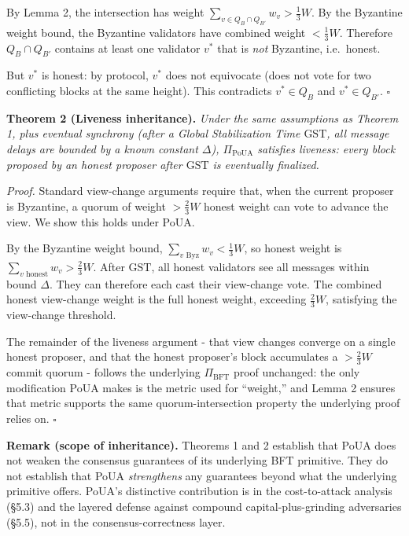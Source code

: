 \documentclass[
  11pt,
]{article}
\begin{document}
By Lemma 2, the intersection has weight
\(\sum_{v \in Q_B \cap Q_{B'}} w_v > \frac{1}{3} W\). By the Byzantine
weight bound, the Byzantine validators have combined weight
\(< \frac{1}{3} W\). Therefore \(Q_B \cap Q_{B'}\) contains at least one
validator \(v^*\) that is \emph{not} Byzantine, i.e.~honest.

But \(v^*\) is honest: by protocol, \(v^*\) does not equivocate (does
not vote for two conflicting blocks at the same height). This
contradicts \(v^* \in Q_B\) and \(v^* \in Q_{B'}\). \(\square\)

\textbf{Theorem 2 (Liveness inheritance).} \emph{Under the same
assumptions as Theorem 1, plus eventual synchrony (after a Global
Stabilization Time \(\text{GST}\), all message delays are bounded by a
known constant \(\Delta\)), \(\Pi_{\text{PoUA}}\) satisfies liveness:
every block proposed by an honest proposer after \(\text{GST}\) is
eventually finalized.}

\emph{Proof.} Standard view-change arguments require that, when the
current proposer is Byzantine, a quorum of weight \(> \frac{2}{3} W\)
honest weight can vote to advance the view. We show this holds under
PoUA.

By the Byzantine weight bound,
\(\sum_{v \text{ Byz}} w_v < \frac{1}{3} W\), so honest weight is
\(\sum_{v \text{ honest}} w_v > \frac{2}{3} W\). After \(\text{GST}\),
all honest validators see all messages within bound \(\Delta\). They can
therefore each cast their view-change vote. The combined honest
view-change weight is the full honest weight, exceeding
\(\frac{2}{3} W\), satisfying the view-change threshold.

The remainder of the liveness argument - that view changes converge on a
single honest proposer, and that the honest proposer's block accumulates
a \(> \frac{2}{3} W\) commit quorum - follows the underlying
\(\Pi_{\text{BFT}}\) proof unchanged: the only modification PoUA makes
is the metric used for ``weight,'' and Lemma 2 ensures that metric
supports the same quorum-intersection property the underlying proof
relies on. \(\square\)

\textbf{Remark (scope of inheritance).} Theorems 1 and 2 establish that
PoUA does not weaken the consensus guarantees of its underlying BFT
primitive. They do not establish that PoUA \emph{strengthens} any
guarantees beyond what the underlying primitive offers. PoUA's
distinctive contribution is in the cost-to-attack analysis (§5.3) and
the layered defense against compound capital-plus-grinding adversaries
(§5.5), not in the consensus-correctness layer.
\end{document}
